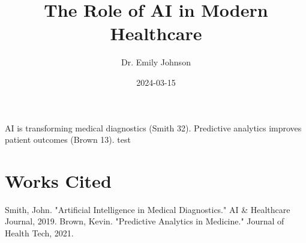 \documentclass{article}
\title{The Role of AI in Modern Healthcare}
\author{Dr. Emily Johnson}
\date{2024-03-15}
\begin{document}
\maketitle
AI is transforming medical diagnostics (Smith 32). Predictive analytics improves patient outcomes (Brown 13). test

\section{Works Cited}
Smith, John. "Artificial Intelligence in Medical Diagnostics." AI \& Healthcare Journal, 2019.
Brown, Kevin. "Predictive Analytics in Medicine." Journal of Health Tech, 2021.
\end{document}
